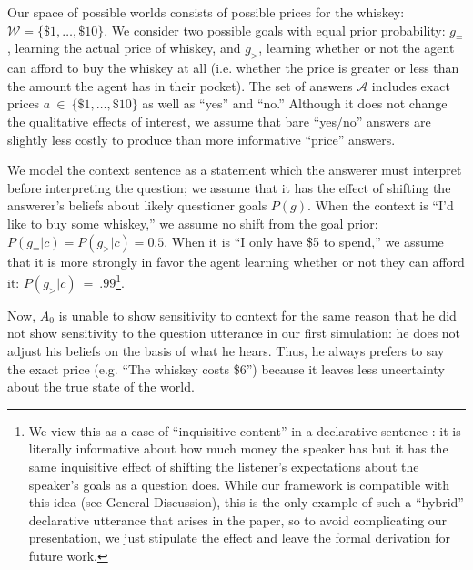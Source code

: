 \documentclass[11pt, floatsintext]{apa6}
\begin{document}
Our space of possible worlds consists of possible prices for the whiskey: $\mathcal{W} = \{\$1, \dots, \$10\}$. We consider two possible goals with equal prior probability: $g_=$, learning the actual price of whiskey,  and $g_>$, learning whether or not the agent can afford to buy the whiskey at all (i.e. whether the price is greater or less than the amount the agent has in their pocket). The set of answers $\mathcal{A}$ includes exact prices $a~\in~\{\$1, \dots, \$10\}$ as well as ``yes'' and ``no.'' 
Although it does not change the qualitative effects of interest, we assume that bare ``yes/no'' answers are slightly less costly to produce than more informative ``price'' answers.


We model the context sentence as a statement which the answerer must interpret before interpreting the question; we assume that it has the effect of shifting the answerer's beliefs about likely questioner goals $P(g)$. When the context is ``I'd like to buy some whiskey,'' we assume no shift from the goal prior: $P(g_= | c) = P(g_> | c) = 0.5$. When it is ``I only have \$5 to spend,'' we assume that it is more strongly in favor the agent learning whether or not they can afford it: $P(g_> | c)~=~.99$\footnote{We view this as a case of ``inquisitive content'' in a declarative sentence \cite{ciardelli2018inquisitive}: it is literally informative about how much money the speaker has but it has the same inquisitive effect of shifting the listener's expectations about the speaker's goals as a question does. While our framework is compatible with this idea (see General Discussion), this is the only example of such a ``hybrid'' declarative utterance that arises in the paper, so to avoid complicating our presentation, we just stipulate the effect and leave the formal derivation for future work.}. 

Now, $A_0$ is unable to show sensitivity to context for the same reason that he did not show sensitivity to the question utterance in our first simulation: he does not adjust his beliefs on the basis of what he hears. Thus, he always prefers to say the exact price (e.g. ``The whiskey costs \$6'') because it leaves less uncertainty about the true state of the world.
\end{document}
